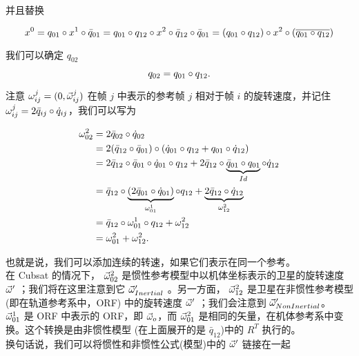 并且替换

\begin{equation*}
x^0=q_{01} \circ x^1 \circ \bar{q}_{01}  =  q_{01} \circ q_{12} \circ x^2 \circ \bar{q}_{12} \circ \bar{q}_{01} 
  =  (q_{01} \circ q_{12}) \circ x^2 \circ (\overline{q_{01} \circ q_{12}})
\end{equation*}
  
我们可以确定 $q_{02}$

\begin{equation}
q_{02} = q_{01} \circ q_{12}.
\end{equation}

注意 $\omega_{ij}^j = (0,\vec{\omega}_{ij}^j)$ 在帧 $j$ 中表示的参考帧 $j$ 相对于帧 $i$ 的旋转速度，并记住 $\omega_{ij}^j = 2\bar{q}_{ij} \circ \dot{q}_{ij}$，我们可以写为

\begin{align*}
\omega_{02}^2  &=   2\bar{q}_{02} \circ \dot{q}_{02} \\
                              &=   2 (\bar{q}_{12} \circ \bar{q}_{01}) \circ (\dot{q}_{01} \circ q_{12}    +   q_{01} \circ \dot{q}_{12}) \\
                              &=   2 \bar{q}_{12} \circ \bar{q}_{01} \circ \dot{q}_{01} \circ q_{12}    +
                                        2 \bar{q}_{12} \circ \underbrace{\bar{q}_{01} \circ  q_{01}}_{Id} \circ \dot{q}_{12} \\
                              &=   \bar{q}_{12} \circ \underbrace{(2 \bar{q}_{01} \circ \dot{q}_{01})}_{\omega_{01}^1} \circ q_{12}    +
                                         \underbrace{2 \bar{q}_{12} \circ  \dot{q}_{12}}_{\omega_{12}^2}\\
                              &=  \bar{q}_{12} \circ \omega_{01}^1 \circ q_{12}    +      \omega_{12}^2 \\
                              &=   \omega_{01}^2   +      \omega_{12}^2.
\end{align*}

也就是说，我们可以添加连续的转速，如果它们表示在同一个参考。\\
在 Cubsat 的情况下， $\vec{\omega}_{02}^2$ 是惯性参考模型中以机体坐标表示的卫星的旋转速度 $\vec{\omega}'$ ；我们将在这里注意到它 $\vec{\omega}'_{Inertial}$ 。另一方面， $\vec{\omega}_{12}^2$ 是卫星在非惯性参考模型 (即在轨道参考系中，ORF) 中的旋转速度 $\vec{\omega}'$ ；我们会注意到 $\vec{\omega}'_{NonInertial}$。 \\
$\vec{\omega}_{01}^1$ 是 ORF 中表示的 ORF，即 $\vec{\omega}_o$，而 $\vec{\omega}_{01}^2$ 是相同的矢量，在机体参考系中变换。这个转换是由非惯性模型 (在上面展开的是 $\bar{q}_{12}$)中的 $R^T$ 执行的。\\
换句话说，我们可以将惯性和非惯性公式(模型)中的 $\vec{\omega}'$ 链接在一起

